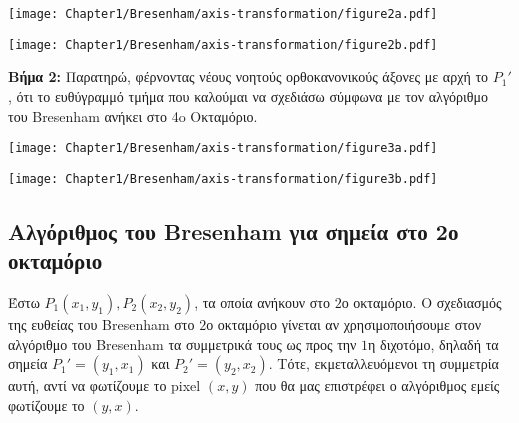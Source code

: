 \begin{minipage}{\textwidth}
	\begin{minipage}[b]{0.5\textwidth} %
	    \centering
	    \texttt{[image: Chapter1/Bresenham/axis-transformation/figure2a.pdf]}
	\end{minipage}%
	\hfill
	\begin{minipage}[b]{0.5\textwidth} %
	    \centering
	    \texttt{[image: Chapter1/Bresenham/axis-transformation/figure2b.pdf]}
	\end{minipage}
\end{minipage}
%
%
\textbf{Βήμα 2:} Παρατηρώ, φέρνοντας νέους νοητούς ορθοκανονικούς άξονες με αρχή το $P_1'$, ότι το ευθύγραμμό τμήμα που καλούμαι να σχεδιάσω σύμφωνα με τον αλγόριθμο του Bresenham ανήκει στο 4o Οκταμόριο.


\begin{minipage}{1\textwidth}
	\begin{minipage}[b]{0.48\textwidth} %
	    \centering
	    \texttt{[image: Chapter1/Bresenham/axis-transformation/figure3a.pdf]}
	\end{minipage}%
	\hfill
	\begin{minipage}[b]{0.48\textwidth} %
	    \centering
	    \texttt{[image: Chapter1/Bresenham/axis-transformation/figure3b.pdf]}
	\end{minipage}
\end{minipage}

\subsection{Αλγόριθμος του Bresenham για σημεία στο 2ο οκταμόριο}

Έστω $P_1(x_1,y_1), P_2(x_2,y_2)$, τα οποία ανήκουν στο $2$ο οκταμόριο. Ο σχεδιασμός της ευθείας του Bresenham στο $2$ο οκταμόριο γίνεται αν χρησιμοποιήσουμε στον αλγόριθμο του Bresenham τα συμμετρικά τους ως προς την $1$η διχοτόμο, δηλαδή τα σημεία $P_1' = (y_1, x_1)$ και $P_2' = (y_2, x_2)$. Τότε, εκμεταλλευόμενοι τη συμμετρία αυτή, αντί να φωτίζουμε το pixel $(x, y)$ που θα μας επιστρέφει ο αλγόριθμος εμείς φωτίζουμε το $(y, x)$. 

